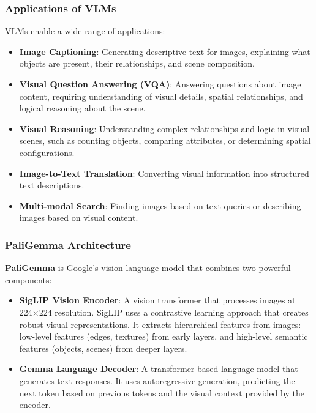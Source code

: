 \documentclass[conference]{IEEEtran}
\begin{document}
\subsubsection{Applications of VLMs}

VLMs enable a wide range of applications:

\begin{itemize}
    \item \textbf{Image Captioning}: Generating descriptive text for images, explaining what objects are present, their relationships, and scene composition.
    
    \item \textbf{Visual Question Answering (VQA)}: Answering questions about image content, requiring understanding of visual details, spatial relationships, and logical reasoning about the scene.
    
    \item \textbf{Visual Reasoning}: Understanding complex relationships and logic in visual scenes, such as counting objects, comparing attributes, or determining spatial configurations.
    
    \item \textbf{Image-to-Text Translation}: Converting visual information into structured text descriptions.
    
    \item \textbf{Multi-modal Search}: Finding images based on text queries or describing images based on visual content.
\end{itemize}

\subsubsection{PaliGemma Architecture}

\textbf{PaliGemma} is Google's vision-language model that combines two powerful components:

\begin{itemize}
    \item \textbf{SigLIP Vision Encoder}: A vision transformer that processes images at 224×224 resolution. SigLIP uses a contrastive learning approach that creates robust visual representations. It extracts hierarchical features from images: low-level features (edges, textures) from early layers, and high-level semantic features (objects, scenes) from deeper layers.
    
    \item \textbf{Gemma Language Decoder}: A transformer-based language model that generates text responses. It uses autoregressive generation, predicting the next token based on previous tokens and the visual context provided by the encoder.
\end{itemize}
\end{document}
